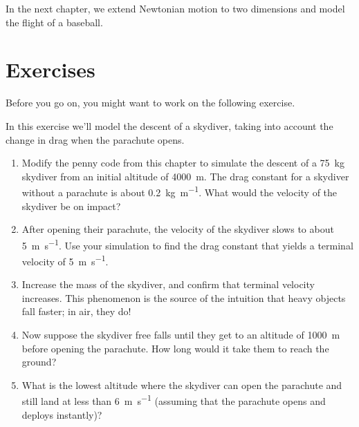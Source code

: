 In the next chapter, we extend Newtonian motion to two dimensions and model the flight of a baseball.


\section{Exercises}

Before you go on, you might want to work on the following exercise.

\begin{ex}

In this exercise we'll model the descent of a skydiver, taking into account the change in drag when the parachute opens.

\begin{enumerate}

\item Modify the penny code from this chapter to simulate the descent of a \SI{75}{\kilogram} skydiver from an initial altitude of \SI{4000}{\meter}.
The drag constant for a skydiver without a parachute is about \SI{0.2}{\kilogram \per \meter}.
What would the velocity of the skydiver be on impact?

\item After opening their parachute, the velocity of the skydiver slows to about \SI{5}{\meter\per\second}.  Use your simulation to find the drag constant that yields a terminal velocity of \SI{5}{\meter\per\second}.

\item Increase the mass of the skydiver, and confirm that terminal velocity increases.  This phenomenon is the source of the intuition that heavy objects fall faster; in air, they do!

\item Now suppose the skydiver free falls until they get to an altitude of \SI{1000}{\meter} before opening the parachute.  How long would it take them to reach the ground?

\item What is the lowest altitude where the skydiver can open the parachute and still land at less than \SI{6}{\meter\per\second} (assuming that the parachute opens and deploys instantly)?

\end{enumerate}


\end{ex}



